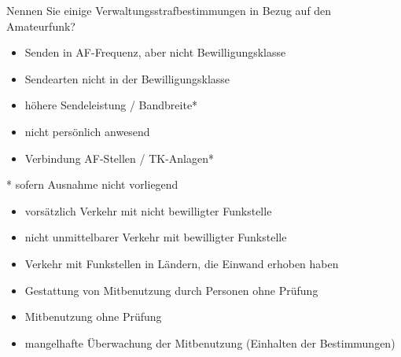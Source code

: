 \documentclass[avery5371,grid,frame,a4paper]{flashcards}
\newcommand{\card}[3]{
  \begin{flashcard}[{\chap} -- #1]{#2}#3\end{flashcard}
}
\begin{document}
\card{37}{Nennen Sie einige Verwaltungsstrafbestimmungen in Bezug auf den Amateurfunk?}{
\scriptsize
  \begin{minipage}{0.48\textwidth}
    \begin{itemize}[leftmargin=10pt,itemsep=0pt]
      \item Senden in AF-Frequenz, aber nicht Bewilligungsklasse
      \item Sendearten nicht in der Bewilligungsklasse
      \item höhere Sendeleistung / Bandbreite*
      \item nicht persönlich anwesend
      \item Verbindung AF-Stellen / TK-Anlagen*
    \end{itemize}
    * \quad sofern Ausnahme nicht vorliegend
  \end{minipage}
  \begin{minipage}{0.5\textwidth}
    \begin{itemize}[leftmargin=10pt,itemsep=0pt]
      \item vorsätzlich Verkehr mit nicht bewilligter Funkstelle
      \item nicht unmittelbarer Verkehr mit bewilligter Funkstelle
      \item Verkehr mit Funkstellen in Ländern, die Einwand erhoben haben
      \item Gestattung von Mitbenutzung durch Personen ohne Prüfung
      \item Mitbenutzung ohne Prüfung
      \item mangelhafte Überwachung der Mitbenutzung (Einhalten der Bestimmungen)
    \end{itemize}
  \end{minipage}
}
\end{document}
